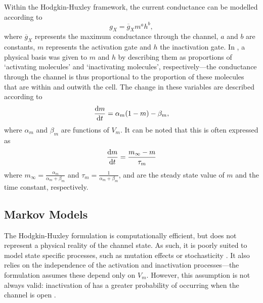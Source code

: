 \documentclass[../thesis-main.tex]{subfiles}
\begin{document}
Within the Hodgkin-Huxley framework, the current conductance can be modelled according to
\begin{equation}
 g_X = \overline{g}_Xm^a h^b,
\end{equation}
where $\overline{g}_X$ represents the maximum conductance through the channel, $a$ and $b$ are constants, $m$ represents the activation gate and $h$ the inactivation gate. In \citet{Hodgkin1952}, a physical basis was given to $m$ and $h$ by describing them as proportions of `activating molecules' and `inactivating molecules', respectively---the conductance through the channel is thus proportional to the proportion of these molecules that are within and outwith the cell. The change in these variables are described according to
\begin{equation}
 \frac{\textnormal{d}m}{\textnormal{d}t} = \alpha_m(1-m)-\beta_m,
\end{equation}
where $\alpha_m$ and $\beta_m$ are functions of $V_m$. It can be noted that this is often expressed as
\begin{equation}
 \frac{\textnormal{d}m}{\textnormal{d}t} = \frac{m_\infty-m}{\tau_m}
\end{equation}
where $m_\infty=\frac{\alpha_m}{\alpha_m+\beta_m}$ and $\tau_m=\frac{1}{\alpha_m+\beta_m}$, and are the steady state value of $m$ and the time constant, respectively.

\subsection{Markov Models}
\label{subsec:markov}
The Hodgkin-Huxley formulation is computationally efficient, but does not represent a physical reality of the channel state. As such, it is poorly suited to model state specific processes, such as mutation effects or stochasticity \citep{Adeniran2011}. It also relies on the independence of the activation and inactivation processes---the formulation assumes these depend only on $V_m$. However, this assumption is not always valid: inactivation of \ina{} has a greater probability of occurring when the channel is open \citep{Bezanilla1977, Armstrong1977}.
\end{document}
